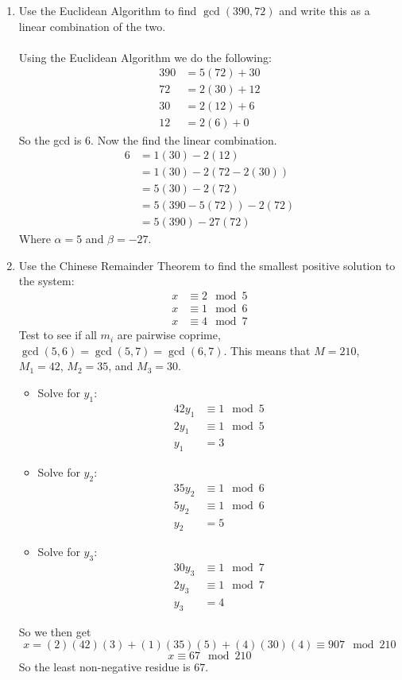 \documentclass[class=article, crop=false]{standalone}
\begin{document}
\begin{enumerate}[1.]
	\item Use the Euclidean Algorithm to find $\gcd (390,72)$ and write this as a linear
	combination of the two. \\\\
	Using the Euclidean Algorithm we do the following:
	\begin{align*}
		390 &= 5(72) + 30 \\
		72 &= 2(30) + 12 \\
		30 &= 2(12) + 6 \\
		12 &= 2(6) + 0
	\end{align*}
	So the gcd is $6$. Now the find the linear combination.
	\begin{align*}
		6 &= 1(30) - 2(12) \\
		&= 1(30) - 2(72 - 2(30)) \\
		&= 5(30) - 2(72) \\
		&= 5(390 - 5(72)) - 2(72) \\
		&= 5(390) - 27(72)
	\end{align*}
	Where $\alpha = 5$ and $\beta = -27$.

	\item Use the Chinese Remainder Theorem to find the smallest positive solution to the
	system:
	\begin{align*}
		x &\equiv 2\mod 5 \\
		x &\equiv 1\mod 6 \\
		x &\equiv 4\mod 7
	\end{align*}
	Test to see if all $m_i$ are pairwise coprime, $\gcd(5,6)=\gcd(5,7)=\gcd(6,7)$. This means that
	$M=210$, $M_1=42$, $M_2=35$, and $M_3=30$.
	\begin{itemize}
		\item[] Solve for $y_1$:
			\begin{align*}
				42y_1 &\equiv 1\mod 5 \\
				2y_1 &\equiv 1\mod 5 \\
				y_1 &= 3
			\end{align*}
		
		\item[] Solve for $y_2$:
			\begin{align*}
				35y_2 &\equiv 1\mod 6 \\
				5y_2 &\equiv 1\mod 6 \\
				y_2 &= 5
			\end{align*}
		
		\item[] Solve for $y_3$:
			\begin{align*}
				30y_3 &\equiv 1\mod 7 \\
				2y_3 &\equiv 1\mod 7 \\
				y_3 &= 4
			\end{align*}
	\end{itemize}
	So we then get
	$$x = (2)(42)(3) + (1)(35)(5) + (4)(30)(4) \equiv 907\mod 210$$
	$$x\equiv 67\mod 210$$
	So the least non-negative residue is $67$.


\end{enumerate}
\end{document}
